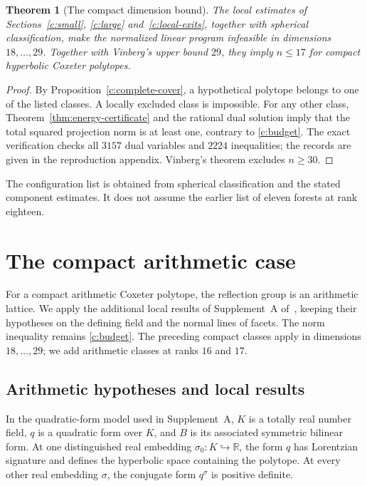 \documentclass[11pt]{article}
\newtheorem{theorem}{Theorem}[section]
\theoremstyle{definition}
\theoremstyle{remark}
\numberwithin{equation}{section}
\newcommand{\R}{\mathbb R}
\begin{document}
\begin{theorem}[The compact dimension bound]\label{c:recovery}
The local estimates of Sections~\ref{c:small}, \ref{c:large}
and~\ref{c:local-exits}, together with spherical classification,
make the normalized linear program infeasible in dimensions
$18,\ldots,29$. Together with Vinberg's upper bound $29$, they
imply $n\le17$ for compact hyperbolic Coxeter polytopes.
\end{theorem}
\begin{proof}
By Proposition~\ref{c:complete-cover}, a hypothetical polytope belongs
to one of the listed classes. A locally excluded class is impossible.
For any other class, Theorem~\ref{thm:energy-certificate} and the
rational dual solution imply that the total squared projection norm
is at least one, contrary to \eqref{c:budget}. The exact verification
checks all $3157$ dual variables and $2224$ inequalities; the records
are given in the reproduction appendix. Vinberg's theorem excludes
$n\ge30$.
\end{proof}

The configuration list is obtained from spherical classification and
the stated component estimates. It does not assume the earlier list
of eleven forests at rank eighteen.

\section{The compact arithmetic case}
\label{a:section}

For a compact arithmetic Coxeter polytope, the reflection group is
an arithmetic lattice. We apply the additional local results of
Supplement~A of~\cite{BoundsSupplement}, keeping their hypotheses
on the defining field and the normal lines of facets. The norm
inequality remains \eqref{c:budget}. The preceding compact classes
apply in dimensions $18,\ldots,29$; we add arithmetic classes at
ranks $16$ and $17$.

\subsection{Arithmetic hypotheses and local results}
\label{a:inputs}

In the quadratic-form model used in Supplement~A, $K$ is a totally
real number field, $q$ is a quadratic form over $K$, and $B$ is its
associated symmetric bilinear form. At one distinguished real
embedding $\sigma_0:K\hookrightarrow\R$, the form $q$ has Lorentzian
signature and defines the hyperbolic space containing the polytope.
At every other real embedding $\sigma$, the conjugate form
$q^\sigma$ is positive definite.
\end{document}
